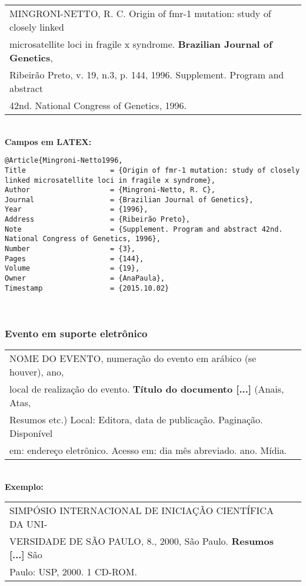\begin{tabular}{|l|c|} \hline
	MINGRONI-NETTO, R. C. Origin of fmr-1 mutation: study of closely linked \\microsatellite loci in fragile x syndrome. \textbf{Brazilian Journal of Genetics}, \\Ribeirão Preto, v. 19, n.3, p. 144, 1996. Supplement. Program and abstract \\42nd. National Congress of Genetics, 1996. 
	\\\hline
\end{tabular} \\

\textbf{Campos em LATEX:} 

\begin{verbatim}
@Article{Mingroni-Netto1996,
Title                    = {Origin of fmr-1 mutation: study of closely 
linked microsatellite loci in fragile x syndrome},
Author                   = {Mingroni-Netto, R. C},
Journal                  = {Brazilian Journal of Genetics},
Year                     = {1996},
Address                  = {Ribeirão Preto},
Note                     = {Supplement. Program and abstract 42nd. 
National Congress of Genetics, 1996},
Number                   = {3},
Pages                    = {144},
Volume                   = {19},
Owner                    = {AnaPaula},
Timestamp                = {2015.10.02}
\end{verbatim} \\

\subsubsection{Evento em suporte eletrônico} 

\begin{tabular}{|l|c|} \hline
	NOME DO EVENTO, numeração do evento em arábico (se
	houver), ano, \\local de realização do evento. \textbf{Título do
		documento [...]} (Anais, Atas, \\Resumos etc.)  Local: Editora, data de publicação. Paginação. Disponível \\ em: endereço eletrônico. Acesso em: dia mês abreviado. ano. Mídia.
	\\\hline
\end{tabular} \\

\textbf{Exemplo:} \\

\begin{tabular}{|l|c|} \hline
	SIMPÓSIO INTERNACIONAL DE INICIAÇÃO CIENTÍFICA DA
	UNI-\\VERSIDADE DE SÃO PAULO, 8., 2000, São Paulo. \textbf{Resumos [...]}
	São \\ Paulo: USP, 2000. 1 CD-ROM.  \\\hline
\end{tabular} \\

